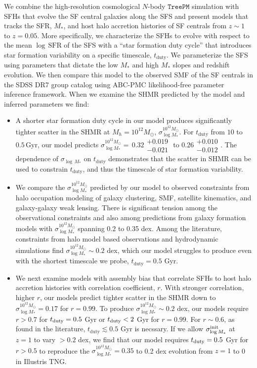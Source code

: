 \documentclass[12pt, letterpaper, preprint, tighten]{aastex62}
\newcommand{\tduty}{t_{\rm duty}}
\newcommand{\bitem}{\begin{itemize}}
\newcommand{\eitem}{\end{itemize}}
\newcommand{\siglogm}{\sigma_{\log M_*}}
\begin{document}
We combine the high-resolution cosmological $N$-body $\mathtt{TreePM}$ simulation
with SFHs that evolve the SF central galaxies along the SFS and present models
that tracks the SFR, $M_*$, and host halo accretion histories of SF centrals from 
$z \sim 1$ to $z=0.05$. More specifically, we characterize the SFHs to evolve with
respect to the mean $\log\,\mathrm{SFR}$ of the SFS with a ``star formation duty cycle'' 
that introduces star formation variability on a specific timescale, $t_\mathrm{duty}$. 
We parameterize the SFS using parameters that dictate the low $M_*$ and high $M_*$ 
slopes and redshift evolution. We then compare this model to the observed SMF of the 
SF centrals in the SDSS DR7 group catalog using ABC-PMC likelihood-free parameter 
inference framework. When we examine the SHMR predicted by the model and inferred 
parameters we find:
\bitem
\item A shorter star formation duty cycle in our model produces significantly
    tighter scatter in the SHMR at $M_h = 10^{12} M_\odot$, $\siglogm^{10^{12}M_\odot}$. 
    For $t_\mathrm{duty}$ from $10$ to $0.5\,\mathrm{Gyr}$, our model predicts
    $\siglogm^{10^{12}M_\odot}{=}\,0.32\substack{+0.019\\ -0.021}$ to $0.26\substack{+0.010\\-0.012}$.
    The dependence of $\sigma_{\log\,M_*}$ on $t_\mathrm{duty}$ demonstrates that
    the scatter in SHMR can be used to constrain $t_\mathrm{duty}$, and thus  
    the timescale of star formation variability.

\item We compare the $\siglogm^{10^{12}M_\odot}$ predicted by our
    model to observed constraints from halo occupation modeling of galaxy clustering, 
    SMF, satellite kinematics, and galaxy-galaxy weak lensing. There is significant 
    tension among the observational constraints and also among predictions from galaxy 
    formation models with $\siglogm^{10^{12}M_\odot}$ spanning $0.2$ to 0.35 dex.
    Among the literature, constraints from halo model based observations and hydrodynamic 
    simulations find $\siglogm^{10^{12}M_\odot} \sim 0.2$ dex, which our model struggles 
    to produce even with the shortest timescale we probe, $t_\mathrm{duty} = 0.5$ Gyr.

\item We next examine models with assembly bias that correlate SFHs to host halo 
    accretion histories with correlation coefficient, $r$. With stronger correlation, 
    higher $r$, our models predict tighter scatter in the SHMR down to 
    $\siglogm^{10^{12}M_\odot}{=}0.17$ for $r = 0.99$. To produce 
    $\siglogm^{10^{12}M_\odot}\sim 0.2$ dex, our models require $r > 0.7$ for  
    $\tduty = 0.5$ Gyr or $\tduty < 2$ Gyr for $r = 0.99$. For $r \sim 0.6$, as 
    found in the literature, $t_\mathrm{duty} \lesssim 0.5$ Gyr is necssary.
    If we allow $\siglogm^{\rm init}$ at $z = 1$ to vary $> 0.2$ dex, we find 
    that our model requires $\tduty = 0.5$ Gyr for $r > 0.5$ to reproduce the
    $\siglogm^{10^{12}M_\odot} = 0.35$ to 0.2 dex evolution from $z=1$ to 0 in 
    Illustris TNG.
\eitem
\end{document}
